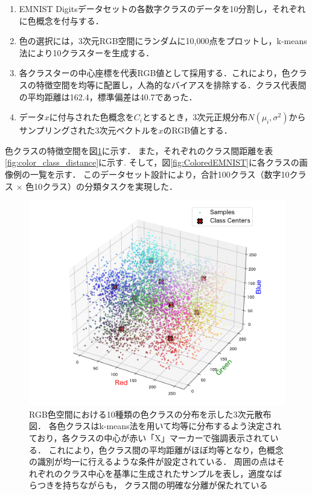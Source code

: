 \begin{enumerate}
    \item EMNIST Digitsデータセットの各数字クラスのデータを10分割し，それぞれに色概念を付与する．
    \item 色の選択には，3次元RGB空間にランダムに10,000点をプロットし，k-means法により10クラスターを生成する．
    \item 各クラスターの中心座標を代表RGB値として採用する．これにより，色クラスの特徴空間を均等に配置し，人為的なバイアスを排除する．クラス代表間の平均距離は162.4，標準偏差は40.7であった．
    \item データ$x$に付与された色概念を$C_i$とするとき，3次元正規分布$N(\mu_i, \sigma^2)$からサンプリングされた3次元ベクトルを$x$のRGB値とする．
\end{enumerate}
色クラスの特徴空間を図\ref{fig:DistributionColors}に示す．
また，それぞれのクラス間距離を表\ref{fig:color_class_distance}に示す.
そして，図\ref{fig:ColoredEMNIST}に各クラスの画像例の一覧を示す．
このデータセット設計により，合計100クラス（数字10クラス × 色10クラス）の分類タスクを実現した．

\begin{figure}[H]
    \centering
    \includegraphics[width=1\columnwidth]{fig/DistributionColors.pdf}
    \caption[RGB色空間における10種類の色クラスの分布を示した3次元散布図]{
        RGB色空間における10種類の色クラスの分布を示した3次元散布図．
        各色クラスはk-means法を用いて均等に分布するよう決定されており，各クラスの中心が赤い「X」マーカーで強調表示されている．
        これにより，色クラス間の平均距離がほぼ均等となり，色概念の識別が均一に行えるような条件が設定されている．
        周囲の点はそれぞれのクラス中心を基準に生成されたサンプルを表し，適度なばらつきを持ちながらも，
        クラス間の明確な分離が保たれている
    }
    \label{fig:DistributionColors}
\end{figure}

